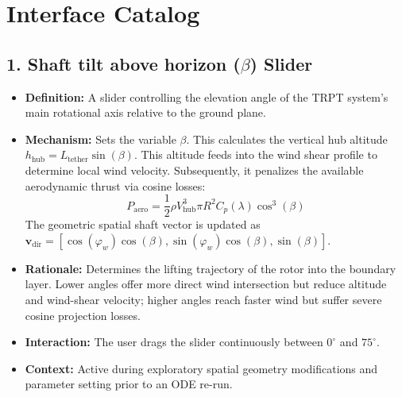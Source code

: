 \documentclass[11pt,a4paper]{article}
\begin{document}
\section{Interface Catalog}

\subsection{1. Shaft tilt above horizon ($\beta$) Slider}
\begin{itemize}
    \item \textbf{Definition:} A slider controlling the elevation angle of the TRPT system's main rotational axis relative to the ground plane.
    \item \textbf{Mechanism:} Sets the variable $\beta$. This calculates the vertical hub altitude $h_{\text{hub}} = L_{\text{tether}} \sin(\beta)$. This altitude feeds into the wind shear profile to determine local wind velocity. Subsequently, it penalizes the available aerodynamic thrust via cosine losses: 
    \begin{equation}
        P_{\text{aero}} = \frac{1}{2} \rho V_{\text{hub}}^3 \pi R^2 C_p(\lambda) \cos^3(\beta)
    \end{equation}
    The geometric spatial shaft vector is updated as $\mathbf{v}_{\text{dir}} = [\cos(\varphi_w)\cos(\beta), \sin(\varphi_w)\cos(\beta), \sin(\beta)]$.
    \item \textbf{Rationale:} Determines the lifting trajectory of the rotor into the boundary layer. Lower angles offer more direct wind intersection but reduce altitude and wind-shear velocity; higher angles reach faster wind but suffer severe cosine projection losses.
    \item \textbf{Interaction:} The user drags the slider continuously between $0^\circ$ and $75^\circ$.
    \item \textbf{Context:} Active during exploratory spatial geometry modifications and parameter setting prior to an ODE re-run.
\end{itemize}
\end{document}
